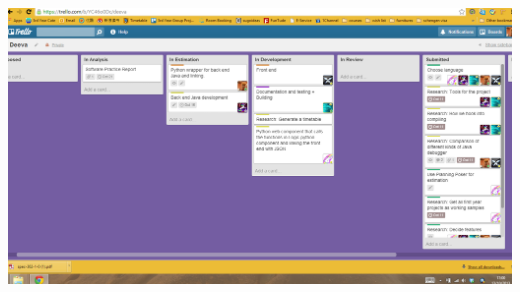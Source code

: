 \documentclass[11pt]{article}
\begin{document}
\includegraphics[width=\textwidth]{TrelloBoard.png}
\end{document}
